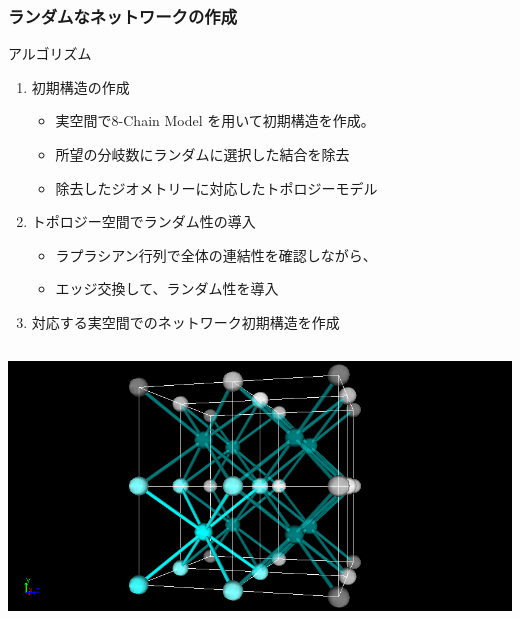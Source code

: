 \documentclass[12pt, dvipdfmx]{beamer}
\begin{document}
\begin{frame}
	\frametitle{ランダムなネットワークの作成}
		\begin{exampleblock}{アルゴリズム}
			\begin{enumerate}
				\item 初期構造の作成
					\begin{itemize}
						\item \alert{実空間}で8-Chain Model を用いて初期構造を作成。
						\item 所望の分岐数に\alert{ランダム}に選択した\alert{結合を除去}
						\item 除去したジオメトリーに対応した\alert{トポロジーモデル}
					\end{itemize}
				\item トポロジー空間でランダム性の導入
					\begin{itemize}
						\item ラプラシアン行列で全体の連結性を確認しながら、
						\item \alert{エッジ交換}して、ランダム性を導入
					\end{itemize}	
				\item 対応する\alert{実空間でのネットワーク初期構造}を作成
			\end{enumerate}
		\end{exampleblock}
		\begin{columns}[T, onlytextwidth]
				\includegraphics[width=\textwidth]{8_per.png}

\end{columns}
\end{frame}
\end{document}
